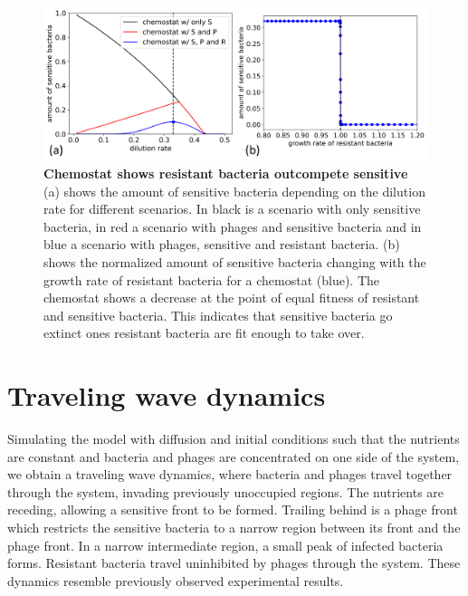 \begin{figure}
\centering
\includegraphics[width=\linewidth]{graphics/2025_09_30_phages_fig3.png}
\caption{\textbf{Chemostat shows resistant bacteria outcompete sensitive} (a) shows the amount of sensitive bacteria depending on the dilution rate for different scenarios. In black is a scenario with only sensitive bacteria, in red a scenario with phages and sensitive bacteria and in blue a scenario with phages, sensitive and resistant bacteria. (b) shows the normalized amount of sensitive bacteria changing with the growth rate of resistant bacteria for a chemostat (blue). The chemostat shows a decrease at the point of equal fitness of resistant and sensitive bacteria. This indicates that sensitive bacteria go extinct ones resistant bacteria are fit enough to take over.}
\label{fig:results_chemostat_traveling_wave}
\end{figure}

\section{Traveling wave dynamics}
Simulating the model with diffusion and initial conditions such that the nutrients are constant and bacteria and phages are concentrated on one side of the system, we obtain a traveling wave dynamics, where bacteria and phages travel together through the system, invading previously unoccupied regions. The nutrients are receding, allowing a sensitive front to be formed. Trailing behind is a phage front which restricts the sensitive bacteria to a narrow region between its front and the phage front. In a narrow intermediate region, a small peak of infected bacteria forms. Resistant bacteria travel uninhibited by phages through the system. These dynamics resemble previously observed experimental results.


